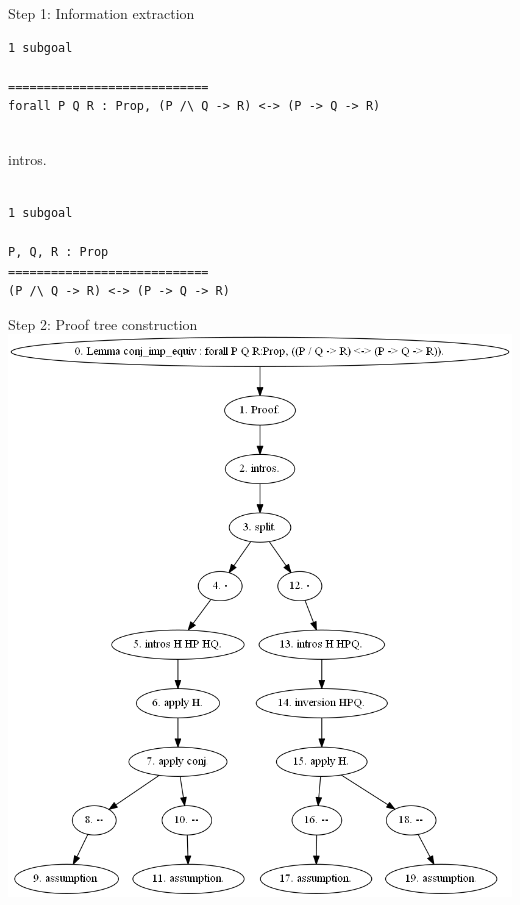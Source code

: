 \documentclass[pdf]{beamer}
\begin{document}
\begin{frame}[fragile]{Step 1: Information extraction}
\begin{adjustbox}{minipage=\linewidth,bgcolor=coqatoo-gray,trim=-3pt 5pt -3pt 5pt}
\begin{lstlisting}[label=listing:before-intros]
1 subgoal

============================
forall P Q R : Prop, (P /\ Q -> R) <-> (P -> Q -> R)
\end{lstlisting}
\end{adjustbox}
\vspace{0.25cm}~\\
intros.\\
\vspace{0cm}~\\
\begin{adjustbox}{minipage=\linewidth,bgcolor=coqatoo-gray,trim=-3pt 5pt -3pt 5pt}
\begin{lstlisting}[label=listing:after-intros]
1 subgoal

P, Q, R : Prop
============================
(P /\ Q -> R) <-> (P -> Q -> R)
\end{lstlisting}
\end{adjustbox}
\end{frame}

\begin{frame}{Step 2: Proof tree construction}
    \vspace{-13pt}\center\includegraphics[height=0.85\textheight]{images/proof-tree.png}
\end{frame}
\end{document}
